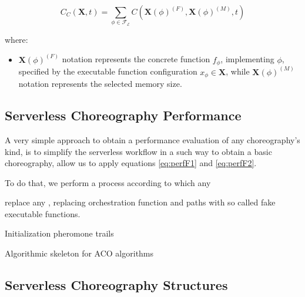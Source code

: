 \documentclass[12pt,a4paper]{report}
\theoremstyle{definition}
\begin{document}
\begin{equation}\label{eq:perfF2}
	C_C(\textbf{X}, t) = \sum_{\phi \in \mathscr{F_E}} C(\textbf{X}(\phi)^{(F)},\textbf{X}(\phi)^{(M)},t)
\end{equation}

where:

\begin{itemize}
	\item $\textbf{X}(\phi)^{(F)}$ notation represents the concrete function $f_{\phi}$, implementing $\phi$, specified by the executable function configuration $x_{\phi} \in \textbf{X}$, while $\textbf{X}(\phi)^{(M)}$ notation represents the selected memory size.
\end{itemize}

\subsection{Serverless Choreography Performance}

A very simple approach to obtain a performance evaluation of any choreography's kind, is to simplify the serverless workflow in a such way to obtain a basic choreography, allow us to apply equations \ref{eq:perfF1} and \ref{eq:perfF2}.

To do that, we perform a process according to which any 


replace any 
, replacing orchestration function and paths with so called fake executable functions.

\begin{algorithm}
	
		
	
	
	Initialization pheromone trails\;
	\caption{Algorithmic skeleton for ACO algorithms}
\end{algorithm}


\subsection{Serverless Choreography Structures}
\end{document}
